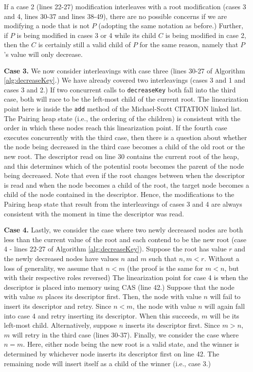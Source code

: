 \documentclass{acm_proc_article-sp}
\begin{document}
If a case 2 (lines 22-27) modification interleaves with
a root modification (cases 3 and 4, lines 30-37 and lines 38-49),
there are no possible concerns if we are modifying a node that
is not $P$ (adopting the same notation as before.) Further, if
$P$ is being modified in cases 3 or 4 while its child $C$ is being
modified in case 2, then the $C$ is certainly still a valid
child of $P$ for the same reason, namely that $P$'s value will only decrease.

\textbf{Case 3.} 
We now consider interleavings with case three (lines 30-27 of Algorithm
\ref{alg:decreaseKey}.) We have already covered two interleavings (cases 3 and 1
and cases 3 and 2.) If two concurrent calls to \texttt{decreaseKey}
both fall into the third case, both will race to be the left-most child
of the current root. The linearization point here is inside the \texttt{add}
method of the Michael-Scott CITATION linked list.
The Pairing heap state (i.e., the ordering of the children) is consistent with the order
in which these nodes reach this linearization point. If the fourth case
executes concurrently with the third case, then there is a question about
whether the node being decreased in the third case becomes a child of
the old root or the new root. The descriptor read on line 30 contains
the current root of the heap, and this determines which of the potential
roots becomes the parent of the node being decreased. Note that even
if the root changes between when the descriptor is read and when
the node becomes a child of the root, the target node becomes a child
of the node contained in the descriptor. Hence, the modifications
to the Pairing heap state that result from the interleavings of cases 3
and 4 are always consistent with the moment in time the descriptor was read.

\textbf{Case 4.} 
Lastly, we consider the case where two newly decreased nodes are both
less than the current value of the root and each contend to be the new
root (case 4 - lines 22-27 of Algorithm \ref{alg:decreaseKey}). Suppose
the root has value $r$ and the newly decreased nodes have values $n$ and $m$
such that $n, m < r$. Without a loss of generality, we assume that $n < m$
(the proof is the same for $m < n$, but with their respective roles
reversed) The linearization point for case 4 is when the descriptor
is placed into memory using CAS (line 42.) Suppose that the node
with value $m$ places its descriptor first. Then, the node with
value $n$ will fail to insert its descriptor and retry. Since $n < m$,
the node with value $n$ will again fall into case 4 and retry inserting
its descriptor. When this succeeds, $m$ will be its left-most child.
Alternatively, suppose $n$ inserts its descriptor first. Since $m > n$, 
$m$ will retry in the third case (lines 30-37). Finally,
we consider the case where $n = m$. Here, either node being
the new root is a valid state, and the winner is determined by whichever
node inserts its descriptor first on line 42. The remaining node will insert
itself as a child of the winner (i.e., case 3.)
\end{document}
